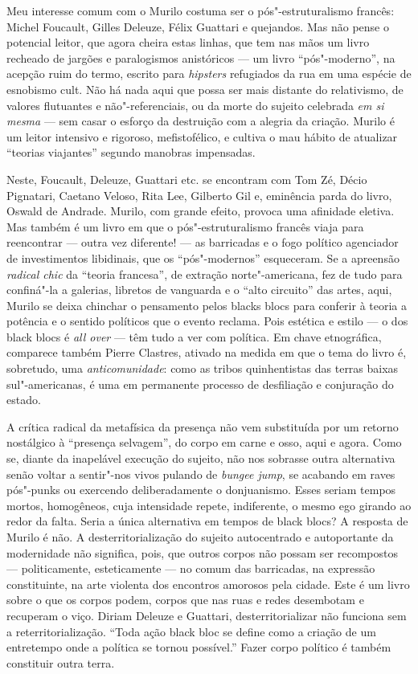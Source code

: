 Meu interesse comum com o Murilo costuma ser o pós"-estruturalismo
francês: Michel Foucault, Gilles Deleuze, Félix Guattari e quejandos.
Mas não pense o potencial leitor, que agora cheira estas linhas, que tem
nas mãos um livro recheado de jargões e paralogismos anistóricos --- um
livro ``pós"-moderno'', na acepção ruim do termo, escrito para
\emph{hipsters} refugiados da rua em uma espécie de esnobismo cult. Não há nada
aqui que possa ser mais distante do relativismo, de valores flutuantes e
não"-referenciais, ou da morte do sujeito celebrada \emph{em si mesma} ---
sem casar o esforço da destruição com a alegria da criação. Murilo é um
leitor intensivo e rigoroso, mefistofélico, e cultiva o mau hábito de
atualizar ``teorias viajantes'' segundo manobras impensadas.

Neste, Foucault, Deleuze, Guattari etc. se encontram com Tom Zé,
Décio Pignatari, Caetano Veloso, Rita Lee, Gilberto Gil e, eminência
parda do livro, Oswald de Andrade. Murilo, com grande efeito, provoca
uma afinidade eletiva. Mas também é um livro em que o pós"-estruturalismo
francês viaja para reencontrar --- outra vez diferente! --- as barricadas
e o fogo político agenciador de investimentos libidinais, que os
``pós"-modernos'' esqueceram. Se a apreensão \emph{radical chic} da
``teoria francesa'', de extração norte"-americana, fez de tudo para
confiná"-la a galerias, libretos de vanguarda e o ``alto circuito'' das
artes, aqui, Murilo se deixa chinchar o pensamento pelos blacks blocs
para conferir à teoria a potência e o sentido políticos que o evento
reclama. Pois estética e estilo --- o dos black blocs é \emph{all over}
--- têm tudo a ver com política. Em chave etnográfica, comparece também
Pierre Clastres, ativado na medida em que o tema do livro é, sobretudo,
uma \emph{anticomunidade}: como as tribos quinhentistas das terras
baixas sul"-americanas, é uma em permanente processo de desfiliação e
conjuração do estado.

A crítica radical da metafísica da presença não vem substituída por um
retorno nostálgico à ``presença selvagem'', do corpo em carne e osso,
aqui e agora. Como se, diante da inapelável execução do sujeito, não nos
sobrasse outra alternativa senão voltar a sentir"-nos vivos pulando de
\emph{bungee jump}, se acabando em raves pós"-punks ou exercendo
deliberadamente o donjuanismo. Esses seriam tempos mortos, homogêneos,
cuja intensidade repete, indiferente, o mesmo ego girando ao redor da
falta. Seria a única alternativa em tempos de black blocs? A resposta de
Murilo é não. A desterritorialização do sujeito autocentrado e
autoportante da modernidade não significa, pois, que outros corpos
não possam ser recompostos --- politicamente, esteticamente --- no comum
das barricadas, na expressão constituinte, na arte violenta dos
encontros amorosos pela cidade. Este é um livro sobre o que os corpos
podem, corpos que nas ruas e redes desembotam e recuperam o viço. Diriam
Deleuze e Guattari, desterritorializar não funciona sem a
reterritorialização. ``Toda ação black bloc se define como a criação de
um entretempo onde a política se tornou possível.'' Fazer corpo político
é também constituir outra terra.

